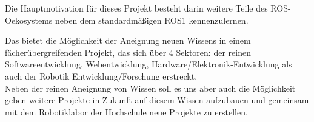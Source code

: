 \begin{flushleft}
    Die Hauptmotivation für dieses Projekt besteht darin weitere Teile des ROS-Oekosystems neben dem standardmäßigen ROS1 kennenzulernen.
    
    Das bietet die Möglichkeit der Aneignung neuen Wissens in einem fächerübergreifenden Projekt, das sich über 4 Sektoren: der reinen Softwareentwicklung,
    Webentwicklung, Hardware/Elektronik-Entwicklung als auch der Robotik Entwicklung/Forschung erstreckt.\\

    Neben der reinen Aneignung von Wissen soll es uns aber auch die Möglichkeit geben weitere Projekte in Zukunft auf diesem Wissen aufzubauen und gemeinsam mit dem Robotiklabor der Hochschule neue Projekte zu erstellen.
\end{flushleft}